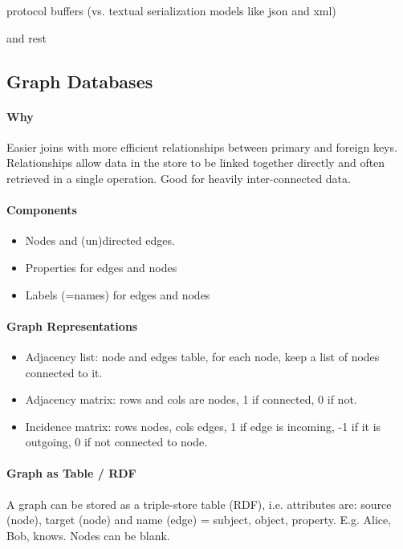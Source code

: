 protocol buffers (vs. textual serialization models like json and xml)

and rest







\subsection{Graph Databases}

\paragraph{Why}
Easier joins with more efficient relationships between primary and foreign keys. Relationships allow data in the store to be linked together directly and often retrieved in a single operation. Good for heavily inter-connected data.

\paragraph{Components}
\begin{itemize}
    \item Nodes and (un)directed edges.
    \item Properties for edges and nodes
    \item Labels (=names) for edges and nodes %
\end{itemize}

\paragraph{Graph Representations}
\begin{itemize}
    \item Adjacency list: node and edges table, for each node, keep a list of nodes connected to it.
    \item Adjacency matrix: rows and cols are nodes, 1 if connected, 0 if not.
    \item Incidence matrix: rows nodes, cols edges, 1 if edge is incoming, -1 if it is outgoing, 0 if not connected to node.
\end{itemize}

\paragraph{Graph as Table / RDF}
A graph can be stored as a triple-store table (RDF), i.e. attributes are: source (node), target (node) and name (edge) = subject, object, property. E.g. Alice, Bob, knows. Nodes can be blank.

